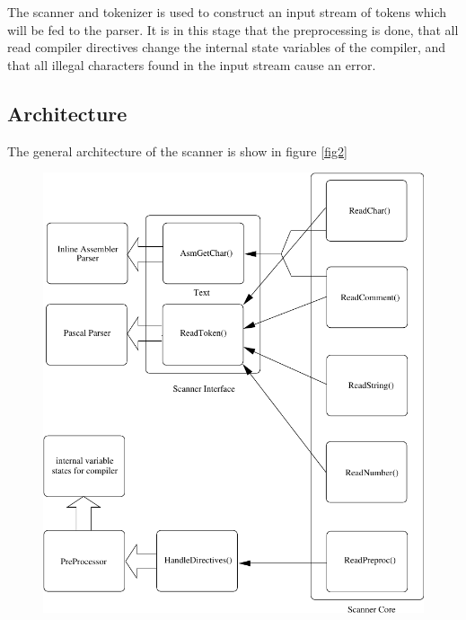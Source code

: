 \documentclass [a4paper,12pt]{article}
\begin{document}
The scanner and tokenizer is used to construct an input stream of tokens
which will be fed to the parser. It is in this stage that the preprocessing
is done, that all read compiler directives change the internal state
variables of the compiler, and that all illegal characters found in the
input stream cause an error.

\subsection{Architecture}
\label{subsec:architectureand}

The general architecture of the scanner is show in figure \ref{fig2}

\begin{figure}
\ifpdf
\includegraphics{arch2.pdf}
\else

\end{figure}
\end{document}
